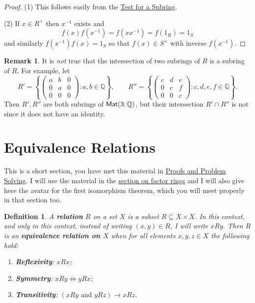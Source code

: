 \documentclass[11pt]{amsbook}
\newtheorem{definition}[theorem]{Definition}
\theoremstyle{definition}
\newtheorem{rem}[theorem]{Remark}
\begin{document}
\begin{proof}
(1) This follows easily from the \hyperref[testforsubring]{Test for a Subring}.

(2) If $x\in R^{\times}$ then $x^{-1}$ exists and $$f(x)f(x^{-1}) = f(xx^{-1}) = f(1_R) = 1_S$$ and similarly $f(x^{-1})f(x) = 1_S$ so that $f(x)\in S^{\times}$ with inverse $f(x^{-1})$.
\end{proof}


\begin{rem} It is \textit{not} true that the intersection of two subrings of $R$ is a subring of $R$. For example, let $$R' = \left\{ \begin{pmatrix} a & b & 0 \\ 0 & a & 0 \\ 0 & 0 & 0 \end{pmatrix} : a,b\in \mathbb{Q} \right\}, \qquad R'' = \left\{ \begin{pmatrix} c & d & e \\ 0 & c & f \\ 0 & 0 & c\end{pmatrix} : c,d,e,f\in \mathbb{Q}\right\}.$$ Then $R', R''$ are both subrings of ${\sf Mat}(3;\mathbb{Q})$, but their intersection $R'\cap R''$ is not since it does not have an identity.
\end{rem}

\section{Equivalence Relations}
\label{equivrel}
This is a short section, you have met this material in \href{http://www.drps.ed.ac.uk/11-12/dpt/cxmath08059.htm}{Proofs and Problem Solving}. I will use the material in the \hyperref[FRFIT]{section on factor rings} and I will also give here the avatar for the first isomorphism theorem, which you will meet properly in that section too.

\begin{definition}
A {\bf relation} $R$ on a set $X$ is a subset $R\subseteq X\times X$. In this context, and only in this context, instead of writing $(x,y)\in R$, I will write $xRy$. Then $R$ is an {\bf equivalence relation on $X$} when for all elements $x,y,z\in X$ the following hold:
\begin{enumerate}
\item {\bf Reflexivity}: $xRx$;
\item {\bf Symmetry}: $xRy \Leftrightarrow yRx$;
\item {\bf Transitivity}: $(xRy \text{ and }yRz) \to xRz$.
\end{enumerate}
\end{definition}
\end{document}
